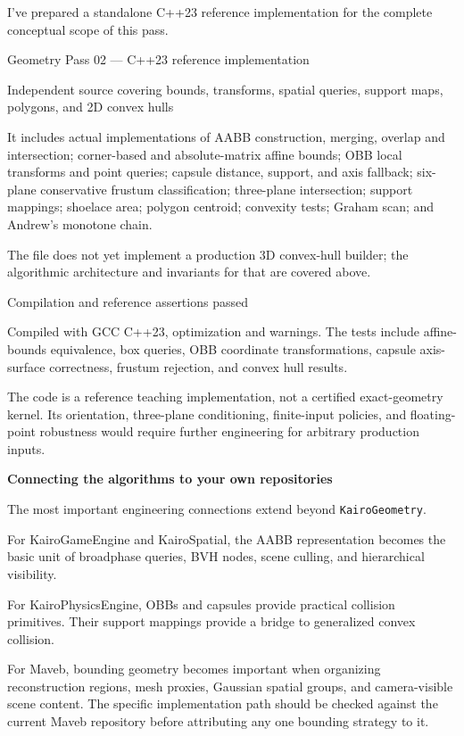 I've prepared a standalone C++23 reference implementation for the complete conceptual scope of this pass.

Geometry Pass 02 --- C++23 reference implementation

Independent source covering bounds, transforms, spatial queries, support maps, polygons, and 2D convex hulls

It includes actual implementations of AABB construction, merging, overlap and intersection; corner-based and absolute-matrix affine bounds; OBB local transforms and point queries; capsule distance, support, and axis fallback; six-plane conservative frustum classification; three-plane intersection; support mappings; shoelace area; polygon centroid; convexity tests; Graham scan; and Andrew's monotone chain.

The file does not yet implement a production 3D convex-hull builder; the algorithmic architecture and invariants for that are covered above.

Compilation and reference assertions passed

Compiled with GCC C++23, optimization and warnings. The tests include affine-bounds equivalence, box queries, OBB coordinate transformations, capsule axis-surface correctness, frustum rejection, and convex hull results.

The code is a reference teaching implementation, not a certified exact-geometry kernel. Its orientation, three-plane conditioning, finite-input policies, and floating-point robustness would require further engineering for arbitrary production inputs.

\textbf{Connecting the algorithms to your own repositories}

The most important engineering connections extend beyond \texttt{KairoGeometry}.

For KairoGameEngine and KairoSpatial, the AABB representation becomes the basic unit of broadphase queries, BVH nodes, scene culling, and hierarchical visibility.

For KairoPhysicsEngine, OBBs and capsules provide practical collision primitives. Their support mappings provide a bridge to generalized convex collision.

For Maveb, bounding geometry becomes important when organizing reconstruction regions, mesh proxies, Gaussian spatial groups, and camera-visible scene content. The specific implementation path should be checked against the current Maveb repository before attributing any one bounding strategy to it.

